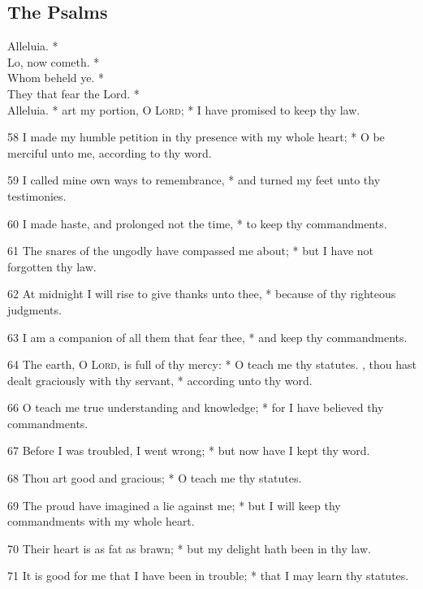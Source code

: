 \subsection{The Psalms}
 Alleluia. *\\
 Lo, now cometh. *\\
 Whom beheld ye. *\\
 They that fear the Lord. *\\
 Alleluia. *
 art my portion, O \textsc{Lord}; * I have promised to keep thy law.
\par
    58 I made my humble petition in thy presence with my whole heart; * O be merciful unto me, according to thy word.
\par
    59 I called mine own ways to remembrance, * and turned my feet unto thy testimonies.
\par
    60 I made haste, and prolonged not the time, * to keep thy commandments.
\par
    61 The snares of the ungodly have compassed me about; * but I have not forgotten thy law.
\par
    62 At midnight I will rise to give thanks unto thee, * because of thy righteous judgments.
\par
    63 I am a companion of all them that fear thee, * and keep thy commandments.
\par
    64 The earth, O \textsc{Lord}, is full of thy mercy: * O teach me thy statutes.
, thou hast dealt graciously with thy servant, * according unto thy word.
\par
    66 O teach me true understanding and knowledge; * for I have believed thy commandments.
\par
    67 Before I was troubled, I went wrong; * but now have I kept thy word.
\par
    68 Thou art good and gracious; * O teach me thy statutes.
\par
    69 The proud have imagined a lie against me; * but I will keep thy commandments with my whole heart.
\par
    70 Their heart is as fat as brawn; * but my delight hath been in thy law.
\par
    71 It is good for me that I have been in trouble; * that I may learn thy statutes.
